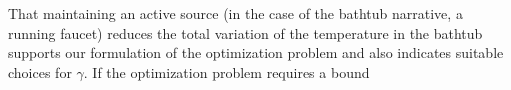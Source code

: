 \documentclass[12pt]{amsart}
\begin{document}
That maintaining an active source (in the case of the bathtub narrative, a
running faucet) reduces the total variation of the temperature in the bathtub
supports our formulation of the optimization problem and also indicates suitable
choices for $\gamma$. If the optimization problem requires a bound

\nocite{*}

\printbibliography
\end{document}

